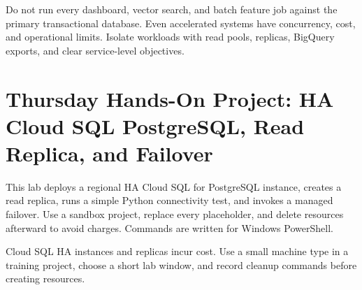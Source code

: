 \begin{pitfall}
Do not run every dashboard, vector search, and batch feature job against the primary transactional database. Even accelerated systems have concurrency, cost, and operational limits. Isolate workloads with read pools, replicas, BigQuery exports, and clear service-level objectives.
\end{pitfall}

\section{Thursday Hands-On Project: HA Cloud SQL PostgreSQL, Read Replica, and Failover}
This lab deploys a regional HA Cloud SQL for PostgreSQL instance, creates a read replica, runs a simple Python connectivity test, and invokes a managed failover. Use a sandbox project, replace every placeholder, and delete resources afterward to avoid charges. Commands are written for Windows PowerShell.

\begin{notebox}
Cloud SQL HA instances and replicas incur cost. Use a small machine type in a training project, choose a short lab window, and record cleanup commands before creating resources.
\end{notebox}

